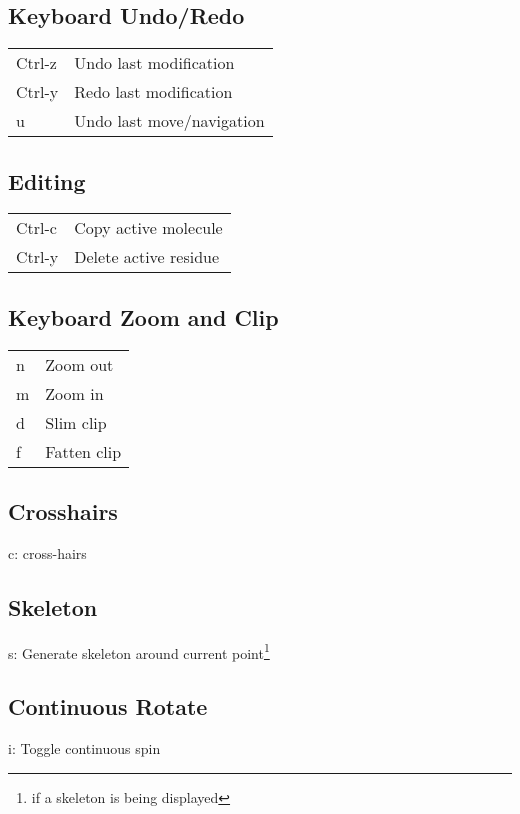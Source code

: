 \documentclass[twocolumn]{article}
\begin{document}
\subsection{Keyboard Undo/Redo}
\begin{tabular}{ll}

  Ctrl-z & Undo last modification   \\
  Ctrl-y & Redo last modification   \\
  u & Undo last move/navigation     \\
\end{tabular}

\subsection{Editing}
\begin{tabular}{ll}

  Ctrl-c & Copy active molecule   \\
  Ctrl-y & Delete active residue  \\
\end{tabular}
	

\subsection{Keyboard Zoom and Clip}

\begin{tabular}{ll}

  n & Zoom out   \\
  m & Zoom in    \\
  d & Slim clip  \\
  f & Fatten clip\\
\end{tabular}

\subsection{Crosshairs}
c: cross-hairs

\subsection{Skeleton}
s: Generate skeleton around current point\footnote{if a skeleton is being
displayed}

\subsection{Continuous Rotate}
i: Toggle continuous spin
\end{document}
